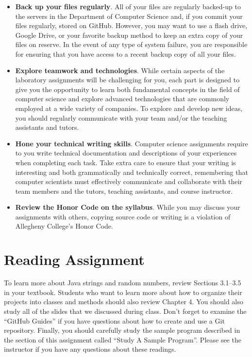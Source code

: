 \documentclass[11pt]{article}
\begin{document}
\begin{itemize}
\item {\bf Back up your files regularly}. All of your files are regularly
  backed-up to the servers in the Department of Computer Science and, if you
  commit your files regularly, stored on GitHub. However, you may want to use a
  flash drive, Google Drive, or your favorite backup method to keep an extra
  copy of your files on reserve. In the event of any type of system failure, you
  are responsible for ensuring that you have access to a recent backup copy of
  all your files.

\item {\bf Explore teamwork and technologies}. While certain aspects of the
  laboratory assignments will be challenging for you, each part is designed to
  give you the opportunity to learn both fundamental concepts in the field of
  computer science and explore advanced technologies that are commonly employed
  at a wide variety of companies. To explore and develop new ideas, you should
  regularly communicate with your team and/or the teaching assistants and
  tutors.

\item {\bf Hone your technical writing skills}. Computer science assignments
  require to you write technical documentation and descriptions of your
  experiences when completing each task. Take extra care to ensure that your
  writing is interesting and both grammatically and technically correct,
  remembering that computer scientists must effectively communicate and
  collaborate with their team members and the tutors, teaching assistants, and
  course instructor.

\item {\bf Review the Honor Code on the syllabus}. While you may discuss your
  assignments with others, copying source code or writing is a violation of
  Allegheny College's Honor Code.

\end{itemize}

\section*{Reading Assignment}

To learn more about Java strings and random numbers, review Sections 3.1--3.5 in
your textbook. Students who want to learn more about how to organize their
projects into classes and methods should also review Chapter 4. You should also
study all of the slides that we discussed during class. Don't forget to examine
the ``GitHub Guides'' if you have questions about how to create and use a Git
repository. Finally, you should carefully study the sample program described in
the section of this assignment called ``{Study A Sample Program}''. Please see
the instructor if you have any questions about these readings.
\end{document}
